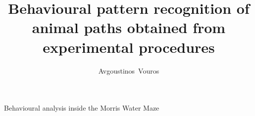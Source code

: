 \documentclass{beamer}
\title{Behavioural pattern recognition of animal paths obtained from experimental procedures}
\author{Avgoustinos~Vouros\inst{1}}
\institute[] %
{
  \inst{1}%
  PhD student, \\Department of Computer Science,\\
  University of Sheffield\\
  \vspace{5mm}
  \noindent Supervised by Prof Eleni Vasilaki
}
\date{} %
\begin{document}
\begin{frame}
  \titlepage
\end{frame}



\begin{frame}[plain,c]

\begin{center}
	\Huge Behavioural analysis inside the Morris Water Maze
\end{center}

\end{frame}
\end{document}
